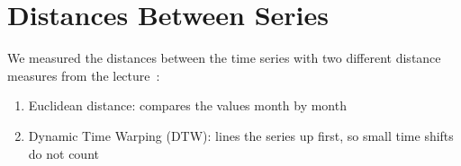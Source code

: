 \documentclass[11pt,a4paper]{article}
\begin{document}
%
%

\section{Distances Between Series}
We measured the distances between the time series with two different distance measures from the lecture~\cite{lecture-ts}:
\begin{enumerate}
\item Euclidean distance: compares the values month by month
\item Dynamic Time Warping (DTW): lines the series up first, so small time shifts do not count
\end{enumerate}
\end{document}
